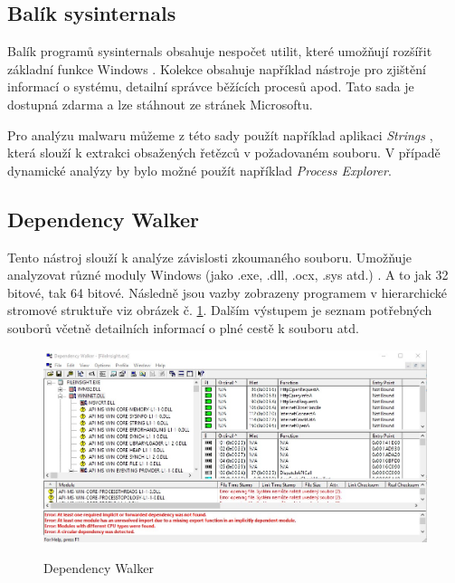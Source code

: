 \subsection{Balík sysinternals}

Balík programů sysinternals obsahuje nespočet utilit, které umožňují rozšířit základní funkce Windows \cite{chip_sysinternals}. Kolekce obsahuje například nástroje pro zjištění informací o systému, detailní správce běžících procesů apod. Tato sada je dostupná zdarma a lze stáhnout ze stránek Microsoftu.

Pro analýzu malwaru můžeme z této sady použít například aplikaci \emph{Strings} \cite{ms_sysinternals}, která slouží k extrakci obsažených řetězců v požadovaném souboru. V případě dynamické analýzy by bylo možné použít například \emph{Process Explorer}.

\subsection{Dependency Walker}
Tento nástroj slouží k analýze závislosti zkoumaného souboru. Umožňuje analyzovat různé moduly Windows (jako .exe, .dll, .ocx, .sys atd.) \cite{depedencywalker}. A to jak 32 bitové, tak 64 bitové. Následně jsou vazby zobrazeny programem v hierarchické stromové struktuře viz obrázek č. \ref{fig:depedency}. Dalším výstupem je seznam potřebných souborů včetně detailních informací o plné cestě k souboru atd.

\begin{figure}[!ht]
    \centering
    \caption{Dependency Walker}
    \includegraphics[width=150mm,scale=0.5]{Figures/obrazky/DependencyWalker.jpg}
    \label{fig:depedency}
\end{figure}
